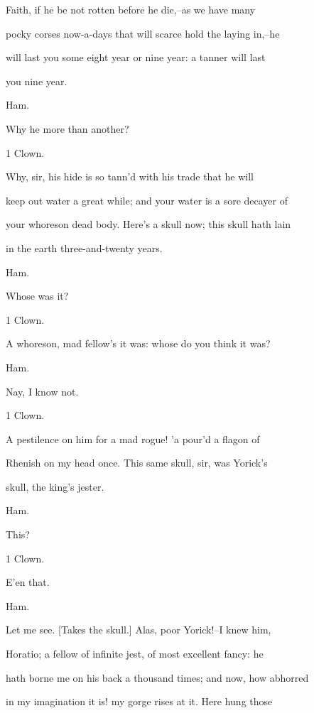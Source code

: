 \documentclass[12pt]{book}
\begin{document}
Faith, if he be not rotten before he die,--as we have many

pocky corses now-a-days that will scarce hold the laying in,--he

will last you some eight year or nine year: a tanner will last

you nine year.



Ham.

Why he more than another?



1 Clown.

Why, sir, his hide is so tann'd with his trade that he will

keep out water a great while; and your water is a sore decayer of

your whoreson dead body. Here's a skull now; this skull hath lain

in the earth three-and-twenty years.



Ham.

Whose was it?



1 Clown.

A whoreson, mad fellow's it was: whose do you think it was?



Ham.

Nay, I know not.



1 Clown.

A pestilence on him for a mad rogue! 'a pour'd a flagon of

Rhenish on my head once. This same skull, sir, was Yorick's

skull, the king's jester.



Ham.

This?



1 Clown.

E'en that.



Ham.

Let me see. [Takes the skull.] Alas, poor Yorick!--I knew him,

Horatio; a fellow of infinite jest, of most excellent fancy: he

hath borne me on his back a thousand times; and now, how abhorred

in my imagination it is! my gorge rises at it. Here hung those
\end{document}
